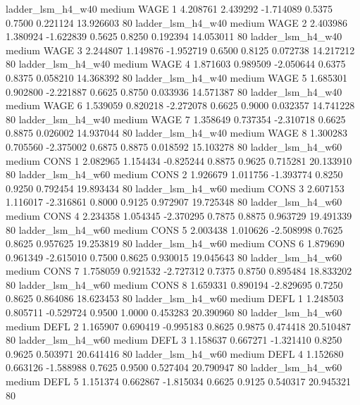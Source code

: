      ladder_lsm_h4_w40     medium     WAGE                 1  4.208761 2.439292 -1.714089 0.5375 0.7500  0.221124   13.926603 80
     ladder_lsm_h4_w40     medium     WAGE                 2  2.403986 1.380924 -1.622839 0.5625 0.8250  0.192394   14.053011 80
     ladder_lsm_h4_w40     medium     WAGE                 3  2.244807 1.149876 -1.952719 0.6500 0.8125  0.072738   14.217212 80
     ladder_lsm_h4_w40     medium     WAGE                 4  1.871603 0.989509 -2.050644 0.6375 0.8375  0.058210   14.368392 80
     ladder_lsm_h4_w40     medium     WAGE                 5  1.685301 0.902800 -2.221887 0.6625 0.8750  0.033936   14.571387 80
     ladder_lsm_h4_w40     medium     WAGE                 6  1.539059 0.820218 -2.272078 0.6625 0.9000  0.032357   14.741228 80
     ladder_lsm_h4_w40     medium     WAGE                 7  1.358649 0.737354 -2.310718 0.6625 0.8875  0.026002   14.937044 80
     ladder_lsm_h4_w40     medium     WAGE                 8  1.300283 0.705560 -2.375002 0.6875 0.8875  0.018592   15.103278 80
     ladder_lsm_h4_w60     medium     CONS                 1  2.082965 1.154434 -0.825244 0.8875 0.9625  0.715281   20.133910 80
     ladder_lsm_h4_w60     medium     CONS                 2  1.926679 1.011756 -1.393774 0.8250 0.9250  0.792454   19.893434 80
     ladder_lsm_h4_w60     medium     CONS                 3  2.607153 1.116017 -2.316861 0.8000 0.9125  0.972907   19.725348 80
     ladder_lsm_h4_w60     medium     CONS                 4  2.234358 1.054345 -2.370295 0.7875 0.8875  0.963729   19.491339 80
     ladder_lsm_h4_w60     medium     CONS                 5  2.003438 1.010626 -2.508998 0.7625 0.8625  0.957625   19.253819 80
     ladder_lsm_h4_w60     medium     CONS                 6  1.879690 0.961349 -2.615010 0.7500 0.8625  0.930015   19.045643 80
     ladder_lsm_h4_w60     medium     CONS                 7  1.758059 0.921532 -2.727312 0.7375 0.8750  0.895484   18.833202 80
     ladder_lsm_h4_w60     medium     CONS                 8  1.659331 0.890194 -2.829695 0.7250 0.8625  0.864086   18.623453 80
     ladder_lsm_h4_w60     medium     DEFL                 1  1.248503 0.805711 -0.529724 0.9500 1.0000  0.453283   20.390960 80
     ladder_lsm_h4_w60     medium     DEFL                 2  1.165907 0.690419 -0.995183 0.8625 0.9875  0.474418   20.510487 80
     ladder_lsm_h4_w60     medium     DEFL                 3  1.158637 0.667271 -1.321410 0.8250 0.9625  0.503971   20.641416 80
     ladder_lsm_h4_w60     medium     DEFL                 4  1.152680 0.663126 -1.588988 0.7625 0.9500  0.527404   20.790947 80
     ladder_lsm_h4_w60     medium     DEFL                 5  1.151374 0.662867 -1.815034 0.6625 0.9125  0.540317   20.945321 80
